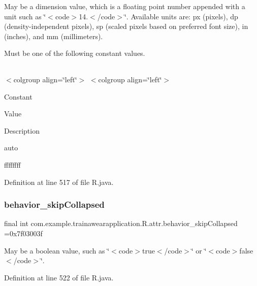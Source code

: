 May be a dimension value, which is a floating point number appended with a unit such as \char`\"{}$<$code$>$14.\+5sp$<$/code$>$\char`\"{}. Available units are\+: px (pixels), dp (density-\/independent pixels), sp (scaled pixels based on preferred font size), in (inches), and mm (millimeters). 

Must be one of the following constant values.

\tabulinesep=1mm
\begin{longtabu}spread 0pt [c]{*{0}{|X[-1]}|}
\hline
\end{longtabu}
$<$colgroup align=\char`\"{}left\char`\"{}$>$ $<$colgroup align=\char`\"{}left\char`\"{}$>$ 

Constant

Value

Description 

auto

ffffffff

Definition at line 517 of file R.\+java.

\mbox{\label{classcom_1_1example_1_1trainawearapplication_1_1_r_1_1attr_a8f636fedcc6932a7cef59833376e30a2}} 
\subsubsection{\texorpdfstring{behavior\_skipCollapsed}{behavior\_skipCollapsed}}
{\footnotesize\ttfamily final int com.\+example.\+trainawearapplication.\+R.\+attr.\+behavior\+\_\+skip\+Collapsed =0x7f03003f\hspace{0.3cm}{\ttfamily [static]}}

May be a boolean value, such as \char`\"{}$<$code$>$true$<$/code$>$\char`\"{} or \char`\"{}$<$code$>$false$<$/code$>$\char`\"{}. 

Definition at line 522 of file R.\+java.

\mbox{\label{classcom_1_1example_1_1trainawearapplication_1_1_r_1_1attr_a7961cc6cd19f50268c9ab94248744ff1}} 
